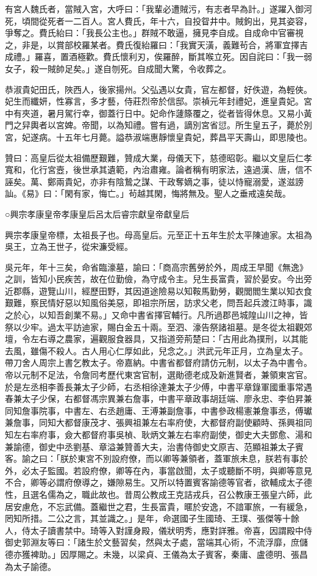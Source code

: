 有宮人魏氏者，當賊入宮，大呼曰：「我輩必遭賊污，有志者早為計。」遂躍入御河死，頃間從死者一二百人。宮人費氏，年十六，自投眢井中。賊鉤出，見其姿容，爭奪之。費氏紿曰：「我長公主也。」群賊不敢逼，擁見李自成。自成命中官審視之，非是，以賞部校羅某者。費氏復紿羅曰：「我實天潢，義難茍合，將軍宜擇吉成禮。」羅喜，置酒極歡。費氏懷利刃，俟羅醉，斷其喉立死。因自詫曰：「我一弱女子，殺一賊帥足矣。」遂自刎死。自成聞大驚，令收葬之。

恭淑貴妃田氏，陜西人，後家揚州。父弘遇以女貴，官左都督，好佚遊，為輕俠。妃生而纖妍，性寡言，多才藝，侍莊烈帝於信邸。崇禎元年封禮妃，進皇貴妃。宮中有夾道，暑月駕行幸，御蓋行日中。妃命作蘧篨覆之，從者皆得休息。又易小黃門之舁輿者以宮婢。帝聞，以為知禮。嘗有過，謫別宮省愆。所生皇五子，薨於別宮，妃遂病。十五年七月薨。謚恭淑端惠靜懷皇貴妃，葬昌平天壽山，即思陵也。

贊曰：高皇后從太祖備歷艱難，贊成大業，母儀天下，慈德昭彰。繼以文皇后仁孝寬和，化行宮壼，後世承其遺範，內治肅雍。論者稱有明家法，遠過漢、唐，信不誣矣。萬、鄭兩貴妃，亦非有陰鷙之謀、干政奪嫡之事，徒以恃寵溺愛，遂滋謗訕。《易》曰：「閑有家，悔亡。」茍越其閑，悔將無及。聖人之垂戒遠矣哉。

○興宗孝康皇帝孝康皇后呂太后睿宗獻皇帝獻皇后

興宗孝康皇帝標，太祖長子也。母高皇后。元至正十五年生於太平陳迪家。太祖為吳王，立為王世子，從宋濂受經。

吳元年，年十三矣，命省臨濠墓，諭曰：「商高宗舊勞於外，周成王早聞《無逸》之訓，皆知小民疾苦，故在位勤儉，為守成令主。兒生長富貴，習於晏安。今出旁近郡縣，遊覽山川，經歷田野，其因道途險易以知鞍馬勤勞，觀閭閻生業以知衣食艱難，察民情好惡以知風俗美惡，即祖宗所居，訪求父老，問吾起兵渡江時事，識之於心，以知吾創業不易。」又命中書省擇官輔行。凡所過郡邑城隍山川之神，皆祭以少牢。過太平訪迪家，賜白金五十兩。至泗、濠告祭諸祖墓。是冬從太祖觀郊壇，令左右導之農家，遍觀服食器具，又指道旁荊楚曰：「古用此為撲刑，以其能去風，雖傷不殺人。古人用心仁厚如此，兒念之。」洪武元年正月，立為皇太子。帶刀舍人周宗上書乞教太子。帝嘉納。中書省都督府請仿元制，以太子為中書令。帝以元制不足法，令詹同考歷代東宮官制，選勛德老成及新進賢者，兼領東宮官。於是左丞相李善長兼太子少師，右丞相徐達兼太子少傅，中書平章錄軍國重事常遇春兼太子少保，右都督馮宗異兼右詹事，中書平章政事胡廷端、廖永忠、李伯昇兼同知詹事院事，中書左、右丞趙庸、王溥兼副詹事，中書參政楊憲兼詹事丞，傅瓛兼詹事，同知大都督康茂才、張興祖兼左右率府使，大都督府副使顧時、孫興祖同知左右率府事，僉大都督府事吳楨、耿炳文兼左右率府副使，御史大夫鄧愈、湯和兼諭德，御史中丞劉基、章溢兼贊善大夫，治書侍御史文原吉、范顯祖兼太子賓客。諭之曰：「朕於東宮不別設府僚，而以卿等兼領者，蓋軍旅未息，朕若有事於外，必太子監國。若設府僚，卿等在內，事當啟聞，太子或聽斷不明，與卿等意見不合，卿等必謂府僚導之，嫌隙易生。又所以特置賓客諭德等官者，欲輔成太子德性，且選名儒為之，職此故也。昔周公教成王克詰戎兵，召公教康王張皇六師，此居安慮危，不忘武備。蓋繼世之君，生長富貴，暱於安逸，不諳軍旅，一有緩急，罔知所措。二公之言，其並識之。」是年，命選國子生國琦、王璞、張傑等十餘人，侍太子讀書禁中。琦等入對謹身殿，儀狀明秀，應對詳雅。帝喜，因謂殿中侍御史郭淵友等曰：「諸生於文藝習矣，然與太子處，當端其心術，不流浮靡，庶儲德亦獲裨助。」因厚賜之。未幾，以梁貞、王儀為太子賓客，秦庸、盧德明、張昌為太子諭德。

